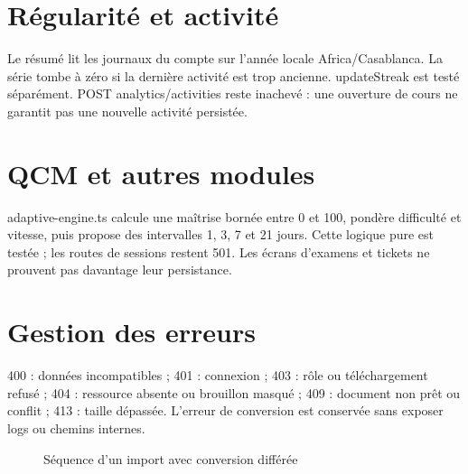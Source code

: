 \section{Régularité et activité}
Le résumé lit les journaux du compte sur l’année locale Africa/Casablanca. La série tombe à zéro si la dernière activité est trop ancienne. updateStreak est testé séparément. POST analytics/activities reste inachevé : une ouverture de cours ne garantit pas une nouvelle activité persistée.

\section{QCM et autres modules}
adaptive-engine.ts calcule une maîtrise bornée entre 0 et 100, pondère difficulté et vitesse, puis propose des intervalles 1, 3, 7 et 21 jours. Cette logique pure est testée ; les routes de sessions restent 501. Les écrans d’examens et tickets ne prouvent pas davantage leur persistance.

\section{Gestion des erreurs}
400 : données incompatibles ; 401 : connexion ; 403 : rôle ou téléchargement refusé ; 404 : ressource absente ou brouillon masqué ; 409 : document non prêt ou conflit ; 413 : taille dépassée. L’erreur de conversion est conservée sans exposer logs ou chemins internes.

\begin{figure}[ht]\centering{}\caption{Séquence d’un import avec conversion différée}\end{figure}
